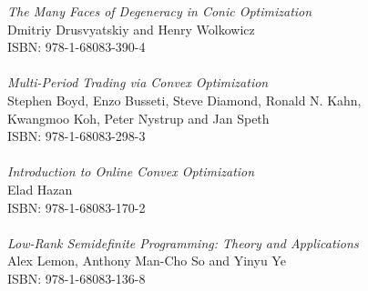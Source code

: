 \vspace{12pt}
\noindent \textit{The Many Faces of Degeneracy in Conic Optimization}\\
Dmitriy Drusvyatskiy and Henry Wolkowicz\\
ISBN: 978-1-68083-390-4\\
\\
\noindent \textit{Multi-Period Trading via Convex Optimization}\\
Stephen Boyd, Enzo Busseti, Steve Diamond, Ronald N. Kahn,\\ Kwangmoo Koh, Peter Nystrup and Jan Speth \\
ISBN: 978-1-68083-298-3\\
\\
\noindent \textit{Introduction to Online Convex Optimization}\\
Elad Hazan\\
ISBN: 978-1-68083-170-2\\
\\
\noindent \textit{Low-Rank Semidefinite Programming: Theory and Applications}\\
Alex Lemon, Anthony Man-Cho So and Yinyu Ye\\
ISBN: 978-1-68083-136-8